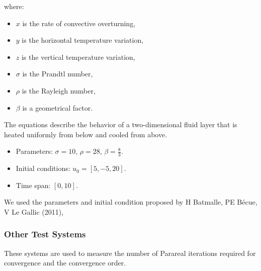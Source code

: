 \documentclass[a4paper,12pt,french]{article}
\begin{document}
where:
\begin{itemize}
    \item $x$ is the rate of convective overturning,
    \item $y$ is the horizontal temperature variation,
    \item $z$ is the vertical temperature variation,
    \item $\sigma$ is the Prandtl number,
    \item $\rho$ is the Rayleigh number,
    \item $\beta$ is a geometrical factor.
\end{itemize}

The equations describe the behavior of a two-dimensional fluid layer that is heated uniformly from below and cooled from above.\\
   
\begin{itemize}
    \item Parameters: $\sigma=10$, $\rho=28$, $\beta=\frac{8}{3}$.
    \item Initial conditions: $u_0=[5,-5,20]$.
    \item Time span: $[0,10]$.
\end{itemize}

We used the parameters and initial condition proposed by H Batmalle, PE Bécue, V Le Gallic (2011),\cite{batmalle2011acceleration}

\subsubsection{Other Test Systems}
These systems are used to measure the number of Parareal iterations required for convergence and the convergence order.
\end{document}
